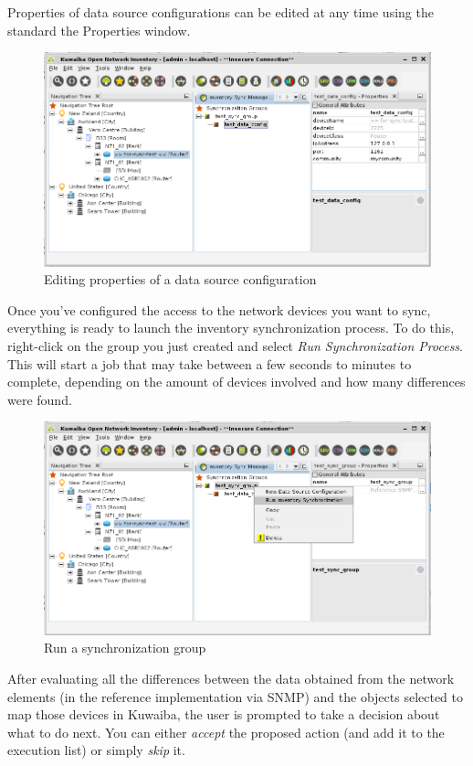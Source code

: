 \documentclass[a4paper]{article}
\begin{document}
			Properties of data source configurations can be edited at any time using the standard the Properties window.\\
			
			\begin{figure}[h!]
				\centering
				\includegraphics[width=0.8\linewidth]{img/sync_data_src_confg_property_sheet.png}
				\caption{Editing properties of a data source configuration}
				\label{fig:sync_data_src_confg_property_sheet}
			\end{figure}
		
			Once you've configured the access to the network devices you want to sync, everything is ready to launch the inventory synchronization process. To do this, right-click on the group you just created and select \textit{Run Synchronization Process}. This will start a job that may take between a few seconds to minutes to complete, depending on the amount of devices involved and how many differences were found.
			\newpage
			\begin{figure}[h!]
				\centering
				\includegraphics[width=0.6\linewidth]{img/sync_run_sync_group.png}
				\caption{Run a synchronization group}
				\label{fig:sync_run_sync_group.png}
			\end{figure}
			
			After evaluating all the differences between the data obtained from the network elements (in the reference implementation via SNMP) and the objects selected to map those devices in Kuwaiba, the user is prompted to take a decision about what to do next. You can either \textit{accept} the proposed action (and add it to the execution list) or simply \textit{skip} it.\\
			
\end{document}
